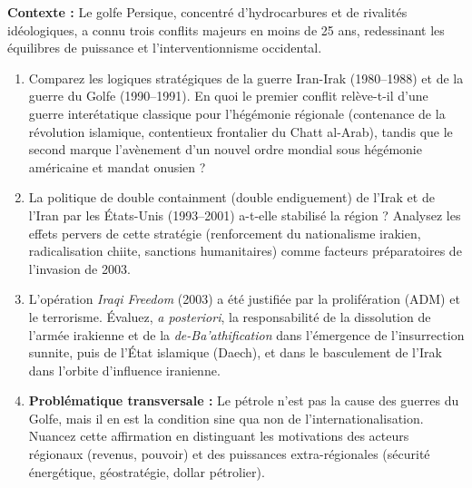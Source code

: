 \documentclass[11pt]{article}
\begin{document}
\begin{exercice}
\textbf{Contexte :} Le golfe Persique, concentré d'hydrocarbures et de rivalités idéologiques, a connu trois conflits majeurs en moins de 25 ans, redessinant les équilibres de puissance et l'interventionnisme occidental.

\begin{enumerate}
    \item Comparez les logiques stratégiques de la guerre Iran-Irak (1980--1988) et de la guerre du Golfe (1990--1991). En quoi le premier conflit relève-t-il d'une guerre interétatique classique pour l'hégémonie régionale (contenance de la révolution islamique, contentieux frontalier du Chatt al-Arab), tandis que le second marque l'avènement d'un \og nouvel ordre mondial \fg{} sous hégémonie américaine et mandat onusien ?
    \item La politique de \og double containment \fg{} (double endiguement) de l'Irak et de l'Iran par les États-Unis (1993--2001) a-t-elle stabilisé la région ? Analysez les effets pervers de cette stratégie (renforcement du nationalisme irakien, radicalisation chiite, sanctions humanitaires) comme facteurs préparatoires de l'invasion de 2003.
    \item L'opération \textit{Iraqi Freedom} (2003) a été justifiée par la prolifération (ADM) et le terrorisme. Évaluez, \textit{a posteriori}, la responsabilité de la dissolution de l'armée irakienne et de la \textit{de-Ba'athification} dans l'émergence de l'insurrection sunnite, puis de l'État islamique (Daech), et dans le basculement de l'Irak dans l'orbite d'influence iranienne.
    \item \textbf{Problématique transversale :} \og Le pétrole n'est pas la cause des guerres du Golfe, mais il en est la condition sine qua non de l'internationalisation. \fg{} Nuancez cette affirmation en distinguant les motivations des acteurs régionaux (revenus, pouvoir) et des puissances extra-régionales (sécurité énergétique, géostratégie, dollar pétrolier).
\end{enumerate}
\end{exercice}
\end{document}

